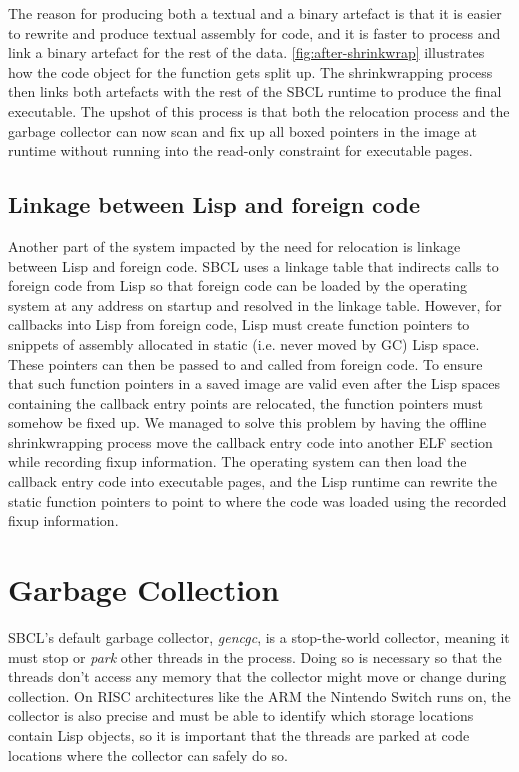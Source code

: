 \documentclass[format=sigconf]{acmart}
\begin{document}
The reason for producing both a textual and a binary artefact is that it is easier to rewrite and produce textual assembly for code, and it is faster to process and link a binary artefact for the rest of the data. \autoref{fig:after-shrinkwrap} illustrates how the code object for the function  gets split up. The shrinkwrapping process then links both artefacts with the rest of the SBCL runtime to produce the final executable. The upshot of this process is that both the relocation process and the garbage collector can now scan and fix up all boxed pointers in the image at runtime without running into the read-only constraint for executable pages.

\subsection{Linkage between Lisp and foreign code}
Another part of the system impacted by the need for relocation is linkage between Lisp and foreign code. SBCL uses a linkage table that indirects calls to foreign code from Lisp so that foreign code can be loaded by the operating system at any address on startup and resolved in the linkage table. However, for callbacks into Lisp from foreign code, Lisp must create function pointers to snippets of assembly allocated in static (i.e. never moved by GC) Lisp space. These pointers can then be passed to and called from foreign code. To ensure that such function pointers in a saved image are valid even after the Lisp spaces containing the callback entry points are relocated, the function pointers must somehow be fixed up. We managed to solve this problem by having the offline shrinkwrapping process move the callback entry code into another  ELF section while recording fixup information. The operating system can then load the callback entry code into executable pages, and the Lisp runtime can rewrite the static function pointers to point to where the code was loaded using the recorded fixup information.

\section{Garbage Collection}\label{gc}
SBCL's default garbage collector, \textit{gencgc}, is a stop-the-world collector, meaning it must stop or \textit{park} other threads in the process. Doing so is necessary so that the threads don't access any memory that the collector might move or change during collection. On RISC architectures like the ARM the Nintendo Switch runs on, the collector is also precise and must be able to identify which storage locations contain Lisp objects, so it is important that the threads are parked at code locations where the collector can safely do so.
\end{document}
